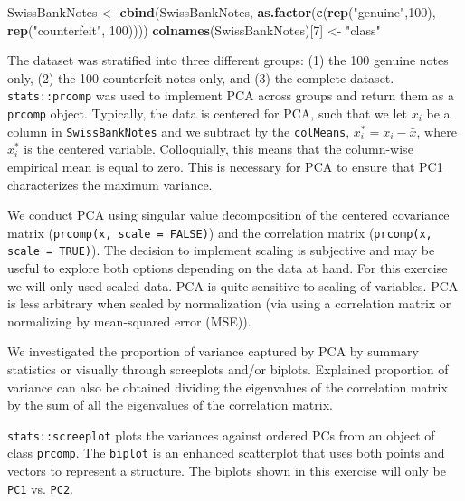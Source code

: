 \documentclass[]{article}
\newenvironment{Shaded}{\begin{snugshade}}{\end{snugshade}}
\newcommand{\KeywordTok}[1]{\textcolor[rgb]{0.13,0.29,0.53}{\textbf{{#1}}}}
\newcommand{\DecValTok}[1]{\textcolor[rgb]{0.00,0.00,0.81}{{#1}}}
\newcommand{\StringTok}[1]{\textcolor[rgb]{0.31,0.60,0.02}{{#1}}}
\newcommand{\NormalTok}[1]{{#1}}
\begin{document}
\begin{Shaded}
\begin{Highlighting}[]
\NormalTok{SwissBankNotes <-}\StringTok{ }\KeywordTok{cbind}\NormalTok{(SwissBankNotes,}
                        \KeywordTok{as.factor}\NormalTok{(}\KeywordTok{c}\NormalTok{(}\KeywordTok{rep}\NormalTok{(}\StringTok{"genuine"}\NormalTok{,}\DecValTok{100}\NormalTok{), }\KeywordTok{rep}\NormalTok{(}\StringTok{"counterfeit"}\NormalTok{, }\DecValTok{100}\NormalTok{))))}
\KeywordTok{colnames}\NormalTok{(SwissBankNotes)[}\DecValTok{7}\NormalTok{] <-}\StringTok{ "class"}
\end{Highlighting}
\end{Shaded}

The dataset was stratified into three different groups: (1) the 100
genuine notes only, (2) the 100 counterfeit notes only, and (3) the
complete dataset. \texttt{stats::prcomp} was used to implement PCA
across groups and return them as a \texttt{prcomp} object. Typically,
the data is centered for PCA, such that we let \(x_{i}\) be a column in
\texttt{SwissBankNotes} and we subtract by the \texttt{colMeans},
\(x^{*}_{i} = x_{i} - \bar{x}\), where \(x^{*}_{i}\) is the centered
variable. Colloquially, this means that the column-wise empirical mean
is equal to zero. This is necessary for PCA to ensure that PC1
characterizes the maximum variance.

We conduct PCA using singular value decomposition of the centered
covariance matrix (\texttt{prcomp(x, scale = FALSE)}) and the
correlation matrix (\texttt{prcomp(x, scale = TRUE)}). The decision to
implement scaling is subjective and may be useful to explore both
options depending on the data at hand. For this exercise we will only
used scaled data. PCA is quite sensitive to scaling of variables. PCA is
less arbitrary when scaled by normalization (via using a correlation
matrix or normalizing by mean-squared error (MSE)).

We investigated the proportion of variance captured by PCA by summary
statistics or visually through screeplots and/or biplots. Explained
proportion of variance can also be obtained dividing the eigenvalues of
the correlation matrix by the sum of all the eigenvalues of the
correlation matrix.

\texttt{stats::screeplot} plots the variances against ordered PCs from
an object of class \texttt{prcomp}. The \texttt{biplot} is an enhanced
scatterplot that uses both points and vectors to represent a structure.
The biplots shown in this exercise will only be \texttt{PC1} vs.
\texttt{PC2}.
\end{document}
